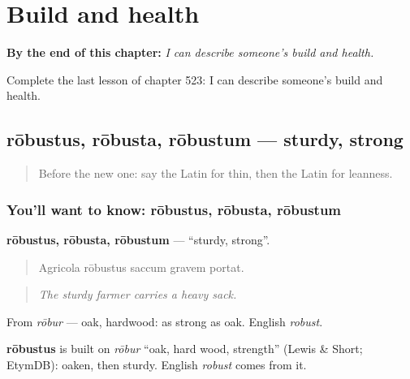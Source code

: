 
\chapter{Build and health}
\label{ch:la-build-and-health}

\begin{chapteropening}
\textbf{By the end of this chapter:} \emph{I can describe someone's build and health.}

Complete the last lesson of chapter 523: I can describe someone's build and health.
\end{chapteropening}

\section[rōbustus, rōbusta, rōbustum]{rōbustus, rōbusta, rōbustum — sturdy, strong}

\label{lesson:LA-C523-robustus}



\begin{quote}
Before the new one: say the Latin for thin, then the Latin for leanness.
\end{quote}

\subsection*{You'll want to know: rōbustus, rōbusta, rōbustum}
\textbf{rōbustus, rōbusta, rōbustum} — \textquotedblleft{}sturdy, strong\textquotedblright{}.

\begin{quote}
Agricola rōbustus saccum gravem portat.
\end{quote}

\begin{quote}
\emph{The sturdy farmer carries a heavy sack.}
\end{quote}

From \emph{rōbur} — oak, hardwood: as strong as oak. English \emph{robust}.

\begin{cousinweb}
\textbf{rōbustus} is built on \emph{rōbur} \textquotedblleft{}oak, hard wood, strength\textquotedblright{} (Lewis \& Short; EtymDB): oaken, then sturdy. English \emph{robust} comes from it.
\end{cousinweb}

